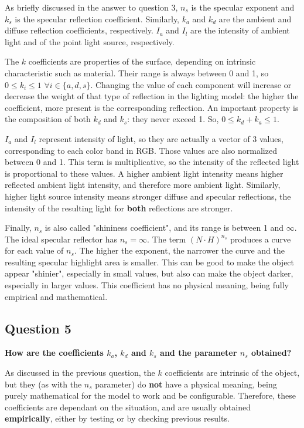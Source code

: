 \documentclass[12pt]{article}
\begin{document}
As briefly discussed in the answer to question 3, $n_s$ is the specular exponent and $k_s$ is the specular reflection coefficient. Similarly, $k_a$ and $k_d$ are the ambient and diffuse reflection coefficients, respectively. $I_a$ and $I_l$ are the intensity of ambient light and of the point light source, respectively.

The $k$ coefficients are properties of the surface, depending on intrinsic characteristic such as material. Their range is always between 0 and 1, so $0 \leq k_i \leq 1$ $\forall i \in \{a,d,s\}$. Changing the value of each component will increase or decrease the weight of that type of reflection in the lighting model: the higher the coefficient, more present is the corresponding reflection. An important property is the composition of both $k_d$ and $k_s$: they never exceed 1. So, $0 \leq k_d+k_a \leq 1$.

$I_a$ and $I_l$ represent intensity of light, so they are actually a vector of 3 values, corresponding to each color band in RGB. Those values are also normalized between 0 and 1. This term is multiplicative, so the intensity of the reflected light is proportional to these values. A higher ambient light intensity means higher reflected ambient light intensity, and therefore more ambient light. Similarly, higher light source intensity means stronger diffuse and specular reflections, the intensity of the resulting light for \textbf{both} reflections are stronger.

Finally, $n_s$ is also called "shininess coefficient", and its range is between 1 and $\infty$. The ideal specular reflector has $n_s=\infty$. The term $(N\cdot H)^{n_s}$ produces a curve for each value of $n_s$. The higher the exponent, the narrower the curve and the resulting specular highlight area is smaller. This can be good to make the object appear "shinier", especially in small values, but also can make the object darker, especially in larger values. This coefficient has no physical meaning, being fully empirical and mathematical.

\subsection*{Question 5}
{\bfseries How are the coefficients $k_a$, $k_d$ and $k_s$ and the parameter $n_s$ obtained?}

As discussed in the previous question, the $k$ coefficients are intrinsic of the object, but they (as with the $n_s$ parameter) do \textbf{not} have a physical meaning, being purely mathematical for the model to work and be configurable. Therefore, these coefficients are dependant on the situation, and are usually obtained \textbf{empirically}, either by testing or by checking previous results.
\end{document}

